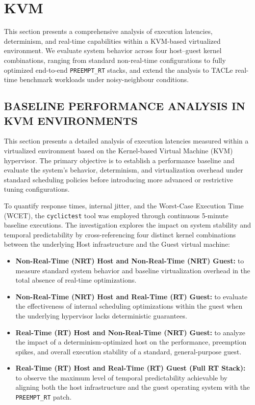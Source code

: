 \section{KVM}
\label{sec:kvm}

This section presents a comprehensive analysis of execution latencies,
determinism, and real-time capabilities within a KVM-based virtualized
environment. We evaluate system behavior across four host--guest kernel
combinations, ranging from standard non-real-time configurations to
fully optimized end-to-end \texttt{PREEMPT\_RT} stacks, and extend the
analysis to TACLe real-time benchmark workloads under noisy-neighbour
conditions.


\subsection{BASELINE PERFORMANCE ANALYSIS IN KVM
ENVIRONMENTS}\label{baseline-performance-analysis-in-kvm-environments}

This section presents a detailed analysis of execution latencies
measured within a virtualized environment based on the Kernel-based
Virtual Machine (KVM) hypervisor. The primary objective is to establish
a performance baseline and evaluate the system's behavior, determinism,
and virtualization overhead under standard scheduling policies before
introducing more advanced or restrictive tuning configurations.

To quantify response times, internal jitter, and the Worst-Case
Execution Time (WCET), the \texttt{cyclictest} tool was employed through
continuous 5-minute baseline executions. The investigation explores the
impact on system stability and temporal predictability by
cross-referencing four distinct kernel combinations between the
underlying Host infrastructure and the Guest virtual machine:

\begin{itemize}
\item
  \textbf{Non-Real-Time (NRT) Host and Non-Real-Time (NRT) Guest:} to
  measure standard system behavior and baseline virtualization overhead
  in the total absence of real-time optimizations.
\item
  \textbf{Non-Real-Time (NRT) Host and Real-Time (RT) Guest:} to
  evaluate the effectiveness of internal scheduling optimizations within
  the guest when the underlying hypervisor lacks deterministic
  guarantees.
\item
  \textbf{Real-Time (RT) Host and Non-Real-Time (NRT) Guest:} to analyze
  the impact of a determinism-optimized host on the performance,
  preemption spikes, and overall execution stability of a standard,
  general-purpose guest.
\item
  \textbf{Real-Time (RT) Host and Real-Time (RT) Guest (Full RT Stack):}
  to observe the maximum level of temporal predictability achievable by
  aligning both the host infrastructure and the guest operating system
  with the \texttt{PREEMPT\_RT} patch.
\end{itemize}

